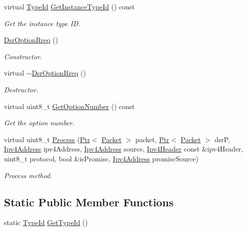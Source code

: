 \begin{DoxyCompactItemize}
\item 
virtual \hyperlink{classns3_1_1TypeId}{Type\+Id} \hyperlink{classns3_1_1dsr_1_1DsrOptionRreq_a4d05ec3c108ae6026cbe7fe35e3b0d97}{Get\+Instance\+Type\+Id} () const 
\begin{DoxyCompactList}\small\item\em Get the instance type ID. \end{DoxyCompactList}\item 
\hyperlink{classns3_1_1dsr_1_1DsrOptionRreq_af9205e27cc438263fd04fe5649f97d2b}{Dsr\+Option\+Rreq} ()
\begin{DoxyCompactList}\small\item\em Constructor. \end{DoxyCompactList}\item 
virtual \hyperlink{classns3_1_1dsr_1_1DsrOptionRreq_a0db364bc360af5937726d3d5195f19fe}{$\sim$\+Dsr\+Option\+Rreq} ()
\begin{DoxyCompactList}\small\item\em Destructor. \end{DoxyCompactList}\item 
virtual uint8\+\_\+t \hyperlink{classns3_1_1dsr_1_1DsrOptionRreq_a0e38455ada16db4001aea897b99ee016}{Get\+Option\+Number} () const 
\begin{DoxyCompactList}\small\item\em Get the option number. \end{DoxyCompactList}\item 
virtual uint8\+\_\+t \hyperlink{classns3_1_1dsr_1_1DsrOptionRreq_a439e889d11973e48e3674c6e86aaee99}{Process} (\hyperlink{classns3_1_1Ptr}{Ptr}$<$ \hyperlink{classns3_1_1Packet}{Packet} $>$ packet, \hyperlink{classns3_1_1Ptr}{Ptr}$<$ \hyperlink{classns3_1_1Packet}{Packet} $>$ dsrP, \hyperlink{classns3_1_1Ipv4Address}{Ipv4\+Address} ipv4\+Address, \hyperlink{classns3_1_1Ipv4Address}{Ipv4\+Address} source, \hyperlink{classns3_1_1Ipv4Header}{Ipv4\+Header} const \&ipv4\+Header, uint8\+\_\+t protocol, bool \&is\+Promisc, \hyperlink{classns3_1_1Ipv4Address}{Ipv4\+Address} promisc\+Source)
\begin{DoxyCompactList}\small\item\em Process method. \end{DoxyCompactList}\end{DoxyCompactItemize}
\subsection*{Static Public Member Functions}
\begin{DoxyCompactItemize}
\item 
static \hyperlink{classns3_1_1TypeId}{Type\+Id} \hyperlink{classns3_1_1dsr_1_1DsrOptionRreq_a0fd0038a185e7dae6d2e9e640e542ee6}{Get\+Type\+Id} ()
\end{DoxyCompactItemize}
